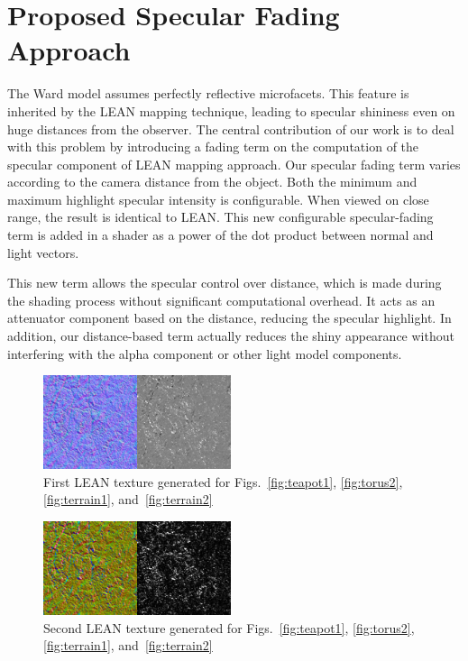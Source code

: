 \documentclass[10pt, conference]{IEEEtran}
\begin{document}
\section{Proposed Specular Fading Approach}
\label{sec:specular_fading}
%
The Ward model assumes perfectly reflective microfacets. This feature is inherited by the LEAN mapping technique, leading to specular shininess even on huge distances from the observer. The central contribution of our work is to deal with this problem by introducing a fading term on the computation of the specular component of LEAN mapping approach. Our specular fading term varies according to the camera distance from the object. Both the minimum and maximum highlight specular intensity is configurable. When viewed on close range, the result is identical to LEAN. This new configurable specular-fading term is added in a shader as a power of the dot product between normal and light vectors.

This new term allows the specular control over distance, which is made during the shading process without significant computational overhead. It acts as an attenuator component based on the distance, reducing the specular highlight. In addition, our distance-based term actually reduces the shiny appearance without interfering with the alpha component or other light model components.

\begin{figure}[t]
	\includegraphics[width=0.49\textwidth]{figs/Lean21.png}
	\caption{First LEAN texture generated for Figs.~\ref{fig:teapot1}, \ref{fig:torus2}, \ref{fig:terrain1}, and~\ref{fig:terrain2}}
	\label{fig:Lean21}
\end{figure}

\begin{figure}[t]
	\includegraphics[width=0.49\textwidth]{figs/Lean22.png}
	\caption{Second LEAN texture generated for Figs.~\ref{fig:teapot1}, \ref{fig:torus2}, \ref{fig:terrain1}, and~\ref{fig:terrain2}}
	\label{fig:Lean22}
\end{figure}
\end{document}
